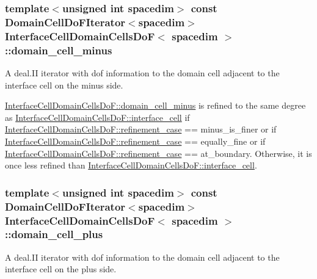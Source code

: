 \subsubsection[{\texorpdfstring{domain\+\_\+cell\+\_\+minus}{domain_cell_minus}}]{\setlength{\rightskip}{0pt plus 5cm}template$<$unsigned int spacedim$>$ const {\bf Domain\+Cell\+Do\+F\+Iterator}$<$spacedim$>$ {\bf Interface\+Cell\+Domain\+Cells\+DoF}$<$ spacedim $>$\+::domain\+\_\+cell\+\_\+minus}\hypertarget{class_interface_cell_domain_cells_do_f_ac8c84df4298d2d5be54dc8bf81e48c4b}{}\label{class_interface_cell_domain_cells_do_f_ac8c84df4298d2d5be54dc8bf81e48c4b}
A deal.\+II iterator with dof information to the domain cell adjacent to the interface cell on the minus side.

\hyperlink{class_interface_cell_domain_cells_do_f_ac8c84df4298d2d5be54dc8bf81e48c4b}{Interface\+Cell\+Domain\+Cells\+Do\+F\+::domain\+\_\+cell\+\_\+minus} is refined to the same degree as \hyperlink{class_interface_cell_domain_cells_do_f_a5fe7922af91545598d89c77ba42a59da}{Interface\+Cell\+Domain\+Cells\+Do\+F\+::interface\+\_\+cell} if \hyperlink{class_interface_cell_domain_cells_do_f_aebb7e5f13d079fc83f98f67bcfcc6de3}{Interface\+Cell\+Domain\+Cells\+Do\+F\+::refinement\+\_\+case} == {\ttfamily minus\+\_\+is\+\_\+finer} or if \hyperlink{class_interface_cell_domain_cells_do_f_aebb7e5f13d079fc83f98f67bcfcc6de3}{Interface\+Cell\+Domain\+Cells\+Do\+F\+::refinement\+\_\+case} == {\ttfamily equally\+\_\+fine} or if \hyperlink{class_interface_cell_domain_cells_do_f_aebb7e5f13d079fc83f98f67bcfcc6de3}{Interface\+Cell\+Domain\+Cells\+Do\+F\+::refinement\+\_\+case} == {\ttfamily at\+\_\+boundary}. Otherwise, it is once less refined than \hyperlink{class_interface_cell_domain_cells_do_f_a5fe7922af91545598d89c77ba42a59da}{Interface\+Cell\+Domain\+Cells\+Do\+F\+::interface\+\_\+cell}. 
\subsubsection[{\texorpdfstring{domain\+\_\+cell\+\_\+plus}{domain_cell_plus}}]{\setlength{\rightskip}{0pt plus 5cm}template$<$unsigned int spacedim$>$ const {\bf Domain\+Cell\+Do\+F\+Iterator}$<$spacedim$>$ {\bf Interface\+Cell\+Domain\+Cells\+DoF}$<$ spacedim $>$\+::domain\+\_\+cell\+\_\+plus}\hypertarget{class_interface_cell_domain_cells_do_f_a8fd9dbd3a1e53023ecca7917b004bab1}{}\label{class_interface_cell_domain_cells_do_f_a8fd9dbd3a1e53023ecca7917b004bab1}
A deal.\+II iterator with dof information to the domain cell adjacent to the interface cell on the plus side.

